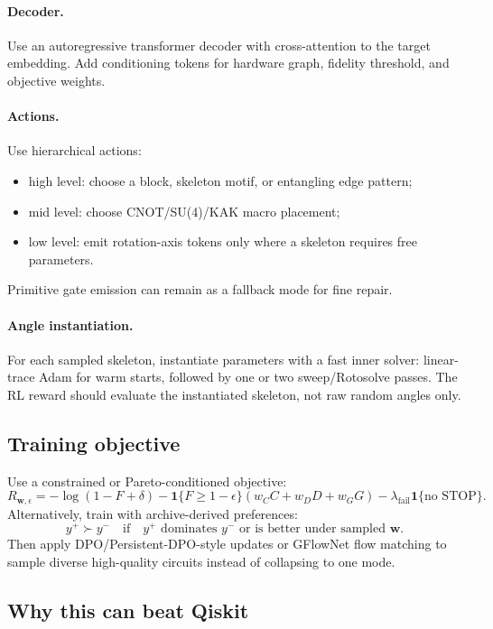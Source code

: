 \documentclass[11pt,a4paper]{article}
\begin{document}
\paragraph{Decoder.}
Use an autoregressive transformer decoder with cross-attention to the target
embedding. Add conditioning tokens for hardware graph, fidelity threshold,
and objective weights.

\paragraph{Actions.}
Use hierarchical actions:
\begin{itemize}[leftmargin=2em]
  \item high level: choose a block, skeleton motif, or entangling edge pattern;
  \item mid level: choose CNOT/SU(4)/KAK macro placement;
  \item low level: emit rotation-axis tokens only where a skeleton requires
        free parameters.
\end{itemize}
Primitive gate emission can remain as a fallback mode for fine repair.

\paragraph{Angle instantiation.}
For each sampled skeleton, instantiate parameters with a fast inner solver:
linear-trace Adam for warm starts, followed by one or two sweep/Rotosolve
passes. The RL reward should evaluate the instantiated skeleton, not raw random
angles only.

\subsection{Training objective}

Use a constrained or Pareto-conditioned objective:
\[
  R_{\bm{w},\epsilon}
  =
  -\log(1-F+\delta)
  - \mathbf{1}\{F\ge 1-\epsilon\}
    (w_C C + w_D D + w_G G)
  - \lambda_{\mathrm{fail}}\mathbf{1}\{\text{no STOP}\}.
\]
Alternatively, train with archive-derived preferences:
\[
  y^+ \succ y^-
  \quad\text{if}\quad
  y^+ \text{ dominates } y^- \text{ or is better under sampled } \bm{w}.
\]
Then apply DPO/Persistent-DPO-style updates or GFlowNet flow matching to
sample diverse high-quality circuits instead of collapsing to one mode.

\subsection{Why this can beat Qiskit}
\end{document}
